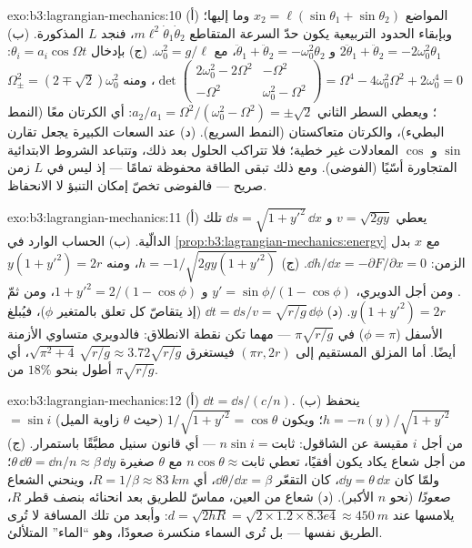 \begin{solution}{exo:b3:lagrangian-mechanics:10}
(أ) المواضع $x_2 = \ell(\sin\theta_1 + \sin\theta_2)$ وما إليها؛ وبإبقاء
الحدود التربيعية يكون حدّ السرعة المتقاطع
$m\ell^2\dot\theta_1\dot\theta_2$، فنجد $L$ المذكورة. (ب)
$2\ddot\theta_1 + \ddot\theta_2 = -2\omega_0^2\theta_1$ و
$\ddot\theta_1 + \ddot\theta_2 = -\omega_0^2\theta_2$، مع $\omega_0^2
= g/\ell$. (ج) بإدخال $\theta_i = a_i\cos\Omega t$:
$\det\begin{pmatrix} 2\omega_0^2 - 2\Omega^2 & -\Omega^2\\ -\Omega^2 &
\omega_0^2 - \Omega^2\end{pmatrix} = \Omega^4 - 4\omega_0^2\Omega^2 +
2\omega_0^4 = 0$، ومنه $\Omega_\pm^2 = (2 \mp \sqrt2)\omega_0^2$؛ ويعطي
السطر الثاني $a_2/a_1 = \Omega^2/(\omega_0^2 - \Omega^2) =
\pm\sqrt2$: أي الكرتان معًا (النمط البطيء)، والكرتان متعاكستان
(النمط السريع). (د) عند السعات الكبيرة يجعل تقارن $\sin$ و $\cos$
المعادلات غير خطية؛ فلا تتراكب الحلول بعد ذلك، وتتباعد الشروط
الابتدائية المتجاورة أسّيًا (الفوضى). ومع ذلك تبقى الطاقة محفوظة
تمامًا --- إذ ليس في $L$ زمن صريح --- فالفوضى تخصّ إمكان التنبؤ
لا الانحفاظ.
\end{solution}

\begin{solution}{exo:b3:lagrangian-mechanics:11}
(أ) يعطي $v = \sqrt{2gy}$ و $\dd s = \sqrt{1 + y'^2}\,\dd x$ تلك
الدالّية. (ب) الحساب الوارد في
\cref{prop:b3:lagrangian-mechanics:energy} مع $x$ بدل الزمن: $\dd
h/\dd x = -\partial F/\partial x = 0$. (ج) $h = -1/\sqrt{2gy(1 +
y'^2)}$، ومنه $y(1 + y'^2) = 2r$. ومن أجل الدويري، $y' =
\sin\phi/(1 - \cos\phi)$ و $1 + y'^2 = 2/(1 - \cos\phi)$، ومن ثمّ
$y(1 + y'^2) = 2r$. (د) $\dd t = \dd s/v = \sqrt{r/g}\,\dd\phi$ (إذ
يتقاصّ كل تعلق بالمتغير $\phi$)، فيُبلغ الأسفل ($\phi = \pi$) في
$\pi\sqrt{r/g}$ --- مهما تكن نقطة الانطلاق: فالدويري متساوي
الأزمنة أيضًا. أما المزلق المستقيم إلى $(\pi r, 2r)$ فيستغرق $\sqrt{\pi^2
+ 4}\,\sqrt{r/g} \approx 3.72\sqrt{r/g}$، أي أطول بنحو $18\%$ من
$\pi\sqrt{r/g}$.
\end{solution}

\begin{solution}{exo:b3:lagrangian-mechanics:12}
(أ) $\dd t = \dd s/(c/n)$. (ب) ينحفظ $h = -n(y)/\sqrt{1 + y'^2}$؛
ويكون $1/\sqrt{1 + y'^2} = \cos\theta$ (حيث $\theta$ زاوية الميل)
$= \sin i$ من أجل $i$ مقيسة عن الشاقول: $n\sin i = \text{ثابت}$ ---
أي قانون سنيل مطبَّقًا باستمرار. (ج) من أجل شعاع يكاد يكون أفقيًا،
تعطي $n\cos\theta \approx \text{ثابت}$ مع $\theta$ صغيرة
$\theta\,\dd\theta = \dd n/n \approx \beta\,\dd y$؛ ولمّا كان $\dd y =
\theta\,\dd x$، كان التقعّر $\dd\theta/\dd x = \beta$، أي $R =
1/\beta \approx \qty{83}{km}$، وينحني الشعاع \emph{صعودًا} (نحو $n$
الأكبر). (د) شعاع من العين، مماسّ للطريق بعد انحنائه بنصف قطر
$R$، يلامسها عند $d = \sqrt{2hR} = \sqrt{2 \times 1.2 \times
8.3e4} \approx \qty{450}{m}$: وأبعد من تلك المسافة لا تُرى الطريق
نفسها --- بل تُرى السماء منكسرة صعودًا، وهو ``الماء'' المتلألئ.
\end{solution}

